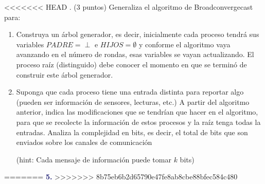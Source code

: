 <<<<<<< HEAD
. (3 puntos) Generaliza el algoritmo de Broadconvergecast para:

\begin{enumerate}
	\item Construya un árbol generador, es decir, inicialmente cada proceso tendrá sus variables $PADRE = \perp$ e $HIJOS = \emptyset$ y conforme el algoritmo vaya avanzando en el número de rondas, esas variables se vayan actualizando. El proceso raíz (distinguido) debe conocer el momento en que se terminó de construir este árbol generador.

	\item Suponga que cada proceso tiene una entrada distinta para reportar algo (pueden ser información de sensores, lecturas, etc.) A partir del algoritmo anterior, indica las modificaciones que se tendrían que hacer en el algoritmo, para que se recolecte la información de estos procesos y la raíz tenga todas la entradas. Analiza la complejidad en bits, es decir, el total de bits que son enviados sobre los canales de comunicación

(hint: Cada mensaje de información puede tomar $k$ bits)
\end{enumerate}
=======
\newpage
\textbf{\textcolor{MidnightBlue}{5.}}
>>>>>>> 8b75eb6b2d65790e47fe8ab8cbe88bfec584c480
